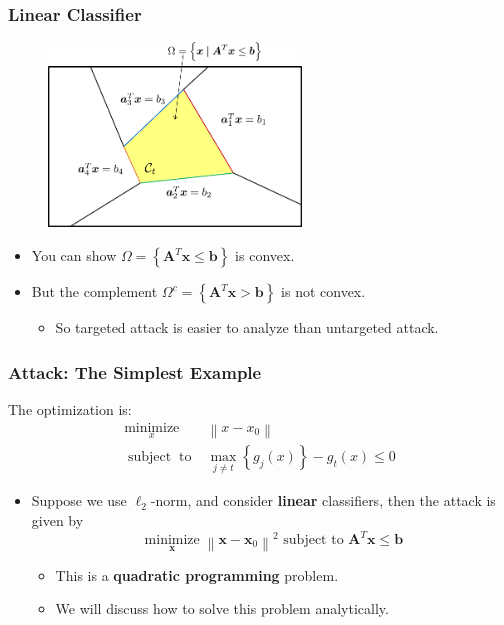 \documentclass[8pt,dvipsnames]{beamer}
\begin{document}
\begin{frame}
	\frametitle{Linear Classifier}
	\begin{figure}[htbp]
		\centering
		\includegraphics[width=0.6\textwidth]{imgs/adv_overview_16.png}
	\end{figure}
	\begin{itemize}
		\item You can show \(\Omega=\left\{\boldsymbol{A}^{T} \boldsymbol{x} \leq \boldsymbol{b}\right\}\) is convex. 
		\item But the complement \(\Omega^{c}=\left\{\boldsymbol{A}^{T} \boldsymbol{x}>\boldsymbol{b}\right\}\) is not convex. 
		\begin{itemize}
			\item So targeted attack is easier to analyze than untargeted attack. 
		\end{itemize}
	\end{itemize}
\end{frame}

\begin{frame}
	\frametitle{Attack: The Simplest Example}
	The optimization is: 
		$$
		\begin{array}{ll}\underset{x}{\operatorname{minimize}} & \left\|x-x_{0}\right\| \\ \operatorname { subject} \operatorname{to} & \max _{j \neq t}\left\{g_{j}(x)\right\}-g_{t}(x) \leq 0\end{array}
		$$
		\begin{itemize}
			\item Suppose we use \(\ell_{2}\)-norm, and consider \textbf{linear} classifiers, then the attack is given by 
			$$
			\underset{\boldsymbol{x}}{\operatorname{minimize}}\left\|\boldsymbol{x}-\boldsymbol{x}_{0}\right\|^{2} \text { subject to } \boldsymbol{A}^{T} \boldsymbol{x} \leq \boldsymbol{b}
			$$
			\begin{itemize}
				\item This is a \textbf{quadratic programming} problem. 
				\item We will discuss how to solve this problem analytically.
			\end{itemize}
		\end{itemize}
\end{frame}
\end{document}
